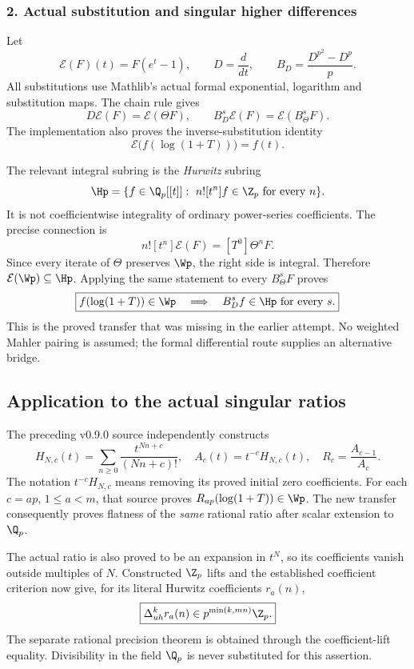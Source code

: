 \subsubsection*{2. Actual substitution and singular higher differences}
Let
\[
 \mathcal E(F)(t)=F(e^t-1),\qquad D=\frac{d}{dt},\qquad
 B_D=\frac{D^{p^2}-D^p}{p}.
\]
All substitutions use Mathlib's actual formal exponential, logarithm and substitution maps. The chain rule gives
\[
 D\mathcal E(F)=\mathcal E(\Theta F),\qquad
 B_D^s\mathcal E(F)=\mathcal E(B_\Theta^sF).
\]
The implementation also proves the inverse-substitution identity
\[
 \mathcal E\bigl(f(\log(1+T))\bigr)=f(t).
\]

The relevant integral subring is the \emph{Hurwitz} subring
\[
 \Hp=\{f\in\Q_p[[t]]:\ n![t^n]f\in\Z_p\ \text{for every }n\}.
\]
It is not coefficientwise integrality of ordinary power-series coefficients. The precise connection is
\[
 n![t^n]\mathcal E(F)=[T^0]\Theta^nF.
\]
Since every iterate of $\Theta$ preserves $\Wp$, the right side is integral. Therefore $\mathcal E(\Wp)\subseteq\Hp$. Applying the same statement to every $B_\Theta^sF$ proves
\[
 \boxed{f(\log(1+T))\in\Wp\quad\Longrightarrow\quad
 B_D^sf\in\Hp\text{ for every }s.}
\]
This is the proved transfer that was missing in the earlier attempt. No weighted Mahler pairing is assumed; the formal differential route supplies an alternative bridge.

\subsection*{Application to the actual singular ratios}
The preceding v0.9.0 source independently constructs
\[
 H_{N,c}(t)=\sum_{n\ge0}\frac{t^{Nn+c}}{(Nn+c)!},\quad
 A_c(t)=t^{-c}H_{N,c}(t),\quad R_c=\frac{A_{c-1}}{A_c}.
\]
The notation $t^{-c}H_{N,c}$ means removing its proved initial zero coefficients. For each $c=ap$, $1\le a<m$, that source proves
$R_{ap}(\log(1+T))\in\Wp$. The new transfer consequently proves flatness of the \emph{same} rational ratio after scalar extension to $\Q_p$.

The actual ratio is also proved to be an expansion in $t^N$, so its coefficients vanish outside multiples of $N$. Constructed $\Z_p$ lifts and the established coefficient criterion now give, for its literal Hurwitz coefficients $r_a(n)$,
\[
 \boxed{\Delta_{uh}^{k}r_a(n)\in p^{\min(k,mn)}\Z_p.}
\]
The separate rational precision theorem is obtained through the coefficient-lift equality. Divisibility in the field $\Q_p$ is never substituted for this assertion.

